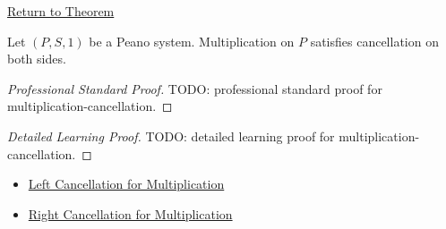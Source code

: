 \newpage
{}
\label{prf:multiplication-cancellation}

\begin{remark*}[Return]
\hyperref[thm:multiplication-cancellation]{Return to Theorem}
\end{remark*}

\begin{theorem*}
Let $(P,S,1)$ be a Peano system. Multiplication on $P$ satisfies cancellation
on both sides.
\end{theorem*}

\begin{proof}[Professional Standard Proof]
\LRAProofBodyStart
TODO: professional standard proof for multiplication-cancellation.
\end{proof}

\begin{proof}[Detailed Learning Proof]
\LRAProofBodyStart
TODO: detailed learning proof for multiplication-cancellation.
\end{proof}

\begin{remark*}
\end{remark*}

\begin{dependencies}
\begin{itemize}
  \item \hyperref[thm:multiplication-left-cancellation]{Left Cancellation for Multiplication}
  \item \hyperref[thm:multiplication-right-cancellation]{Right Cancellation for Multiplication}
\end{itemize}
\end{dependencies}

\clearpage
